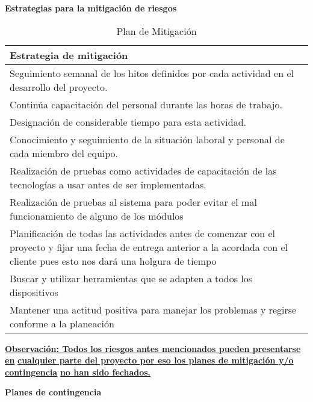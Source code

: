 \textbf{Estrategias para la mitigación de riesgos}
\newline

\begin{table}
	\begin{center}
		\begin{tabular}{|p{14.2cm}|}
			\hline \rowcolor[RGB]{0,102,204} 
				\textcolor{blanco}{\bf Estrategia de mitigación} \\
			\hline 
				Seguimiento semanal de los hitos definidos por cada actividad en el desarrollo del proyecto. \\
      		\hline 
				Continúa capacitación del personal durante las horas de trabajo. \\
			\hline 
				Designación de considerable tiempo para esta actividad. \\ 
			\hline
				Conocimiento y seguimiento de la situación laboral y personal de cada miembro del equipo. \\ 
			\hline 
				Realización de pruebas como actividades de capacitación de las tecnologías a usar antes de ser implementadas. \\ 
			\hline
				Realización de pruebas al sistema para poder evitar el mal funcionamiento de alguno de los módulos \\ 
			\hline
				Planificación de todas las actividades antes de comenzar con el proyecto y fijar una fecha de entrega anterior a la acordada con el cliente pues esto nos dará una holgura de tiempo \\ 
			\hline
				Buscar y utilizar herramientas que se adapten a todos los dispositivos \\ 
			\hline
				Mantener una actitud positiva para manejar  los problemas y regirse conforme a la planeación \\ 
			\hline
		\end{tabular}
	\end{center}
	\caption[Plan de Mitigación]{Plan de Mitigación} 
	\label{tab:planMitigacion}
\end{table}

\begin{center}
	{\bf \underline{Observación: Todos los riesgos antes mencionados pueden presentarse en}}
	{\bf \underline{cualquier parte del proyecto por eso  los planes de mitigación y/o contingencia}}
	{\bf \underline{no han sido fechados.}}
\end{center} 

\textbf{Planes de contingencia}
\newline

